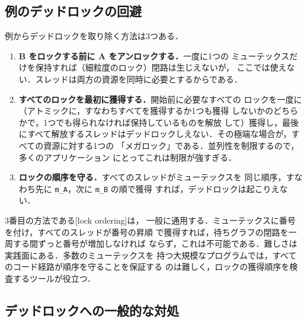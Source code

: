 \documentclass[../main.tex]{subfiles}
\begin{document}
\subsection{例のデッドロックの回避}

例からデッドロックを取り除く方法は3つある．
\begin{enumerate}
  \item \textbf{B をロックする前に A をアンロックする．}一度に1つの
    ミューテックスだけを保持すれば（細粒度のロック）閉路は生じえないが，
    ここでは使えない．スレッドは両方の資源を同時に必要とするからである．
  \item \textbf{すべてのロックを最初に獲得する．}開始前に必要なすべての
    ロックを一度に（アトミックに，すなわちすべてを獲得するか1つも獲得
    しないかのどちらかで，1つでも得られなければ保持しているものを解放
    して）獲得し，最後にすべて解放するスレッドはデッドロックしえない．その極端な場合が，すべての資源に対する1つの
    「メガロック」である．並列性を制限するので，多くのアプリケーション
    にとってこれは制限が強すぎる．
  \item \textbf{ロックの順序を守る．}すべてのスレッドがミューテックスを
    同じ順序，すなわち先に \texttt{m\_A}，次に \texttt{m\_B} の順で獲得
    すれば，デッドロックは起こりえない．
\end{enumerate}

3番目の方法である[lock ordering]は，
一般に通用する．ミューテックスに番号を付け，すべてのスレッドが番号の昇順
で獲得すれば，待ちグラフの閉路を一周する間ずっと番号が増加しなければ
ならず，これは不可能である．難しさは実践面にある．多数のミューテックスを
持つ大規模なプログラムでは，すべてのコード経路が順序を守ることを保証する
のは難しく，ロックの獲得順序を検査するツールが役立つ．

\subsection{デッドロックへの一般的な対処}
\end{document}
